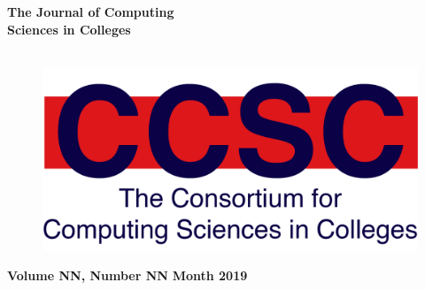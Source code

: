 \documentclass{article}
\begin{document}
\thispagestyle{empty}

\begin{textsf}

\begin{center}
\textbf{\Huge{
The Journal of Computing\\
Sciences in Colleges\\
}}\\
\end{center}

\vspace{30pt}

\begin{figure}[h]
\includegraphics[scale=0.7]{CCSC_logo.png}
\centering
\end{figure}

\vfill

{\parindent0pt
\textbf{\Large Volume NN, Number NN} \hfill \textbf{\Large Month 2019}
}
\end{textsf}
\end{document}
